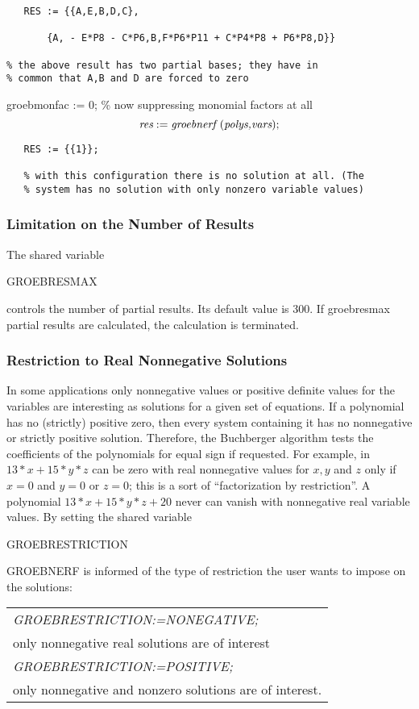 \begin{verbatim}
   RES := {{A,E,B,D,C},

       {A, - E*P8 - C*P6,B,F*P6*P11 + C*P4*P8 + P6*P8,D}}

% the above result has two partial bases; they have in
% common that A,B and D are forced to zero
\end{verbatim}

groebmonfac := 0; \% now suppressing monomial factors at all
\[
\mbox{\it res} := \mbox{\it groebnerf }(\mbox{\it polys,vars});
\]
\begin{verbatim}
   RES := {{1}};

   % with this configuration there is no solution at all. (The
   % system has no solution with only nonzero variable values)
\end{verbatim}

\subsubsection{Limitation on the Number of Results}
The shared variable
\begin{center}
GROEBRESMAX
\end{center}
controls the number of partial results. Its default value is 300. If
groebresmax partial results are calculated, the calculation is
terminated.

\subsubsection{Restriction to Real Nonnegative Solutions}
In some applications only nonnegative values or positive definite
values for the variables are interesting as solutions for a given set
of equations. If a polynomial has no (strictly) positive zero, then
every system containing it has no nonnegative or strictly positive
solution. Therefore, the Buchberger algorithm tests the coefficients of
the polynomials for equal sign if requested. For example, in $13*x +
15*y*z $ can be zero with real nonnegative values for $x, y$ and $z$
only if $x=0$ and $y=0$ or $ z=0$; this is a sort of ``factorization by
restriction''. A polynomial $13*x + 15*y*z + 20$ never can vanish
with nonnegative real variable values. By setting the shared variable
\begin{center} GROEBRESTRICTION \end{center}
GROEBNERF is informed of the type of restriction the user wants to
impose on the solutions:
\begin{center}
\begin{tabular}{l}
{\it GROEBRESTRICTION:=NONEGATIVE;} \\
\hspace*{+.5cm} only nonnegative real solutions are of
interest\vspace*{4mm} \\
{\it GROEBRESTRICTION:=POSITIVE;} \\
\hspace*{+.5cm}only nonnegative and nonzero solutions are of
interest.
\end{tabular}
\end{center}

